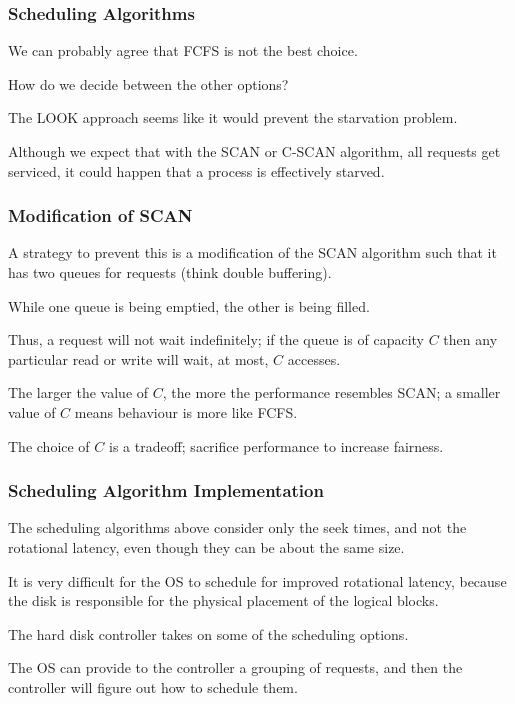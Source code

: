 \begin{frame}
\frametitle{Scheduling Algorithms}

We can probably agree that FCFS is not the best choice.

How do we decide between the other options?

The LOOK approach seems like it would prevent the starvation problem. 

Although we expect that with the SCAN or C-SCAN algorithm, all requests get serviced, it could happen that a process is effectively starved.

\end{frame}

\begin{frame}
\frametitle{Modification of SCAN}

A strategy to prevent this is a modification of the SCAN algorithm such that it has two queues for requests (think double buffering). 

While one queue is being emptied, the other is being filled. 

Thus, a request will not wait indefinitely; if the queue is of capacity $C$ then any particular read or write will wait, at most, $C$ accesses. 

The larger the value of $C$, the more the performance resembles SCAN; a smaller value of $C$ means behaviour is more like FCFS. 

The choice of $C$ is a tradeoff; sacrifice performance to increase fairness.


\end{frame}



\begin{frame}
\frametitle{Scheduling Algorithm Implementation}

The scheduling algorithms above consider only the seek times, and not the rotational latency, even though they can be about the same size. 

It is very difficult for the OS to schedule for improved rotational latency, because the disk is responsible for the physical placement of the logical blocks. 

The hard disk controller takes on some of the scheduling options. 

The OS can provide to the controller a grouping of requests, and then the controller will figure out how to schedule them.

\end{frame}

